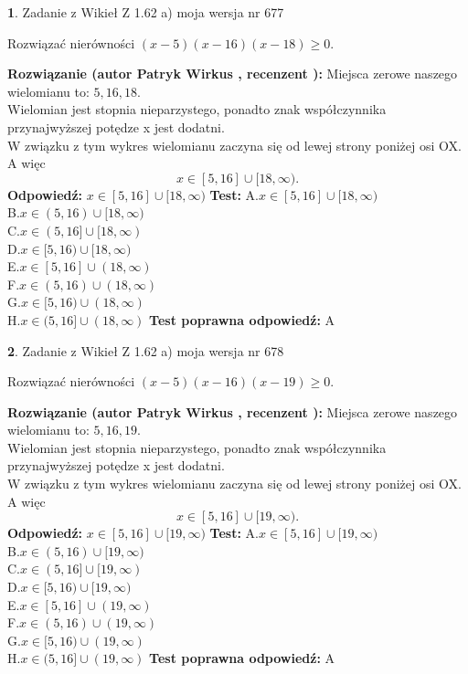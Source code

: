 \documentclass[12pt, a4paper]{article}
\theoremstyle{definition} %
\newtheorem{zad}{}
\newcommand{\zadStart}[1]{\begin{zad}#1\newline}
\newcommand{\zadStop}{\end{zad}}
\newcommand{\rozwStart}[2]{\noindent \textbf{Rozwiązanie (autor #1 , recenzent #2): }\newline}
\newcommand{\rozwStop}{\newline}
\newcommand{\odpStart}{\noindent \textbf{Odpowiedź:}\newline}
\newcommand{\odpStop}{\newline}
\newcommand{\testStart}{\noindent \textbf{Test:}\newline}
\newcommand{\testStop}{\newline}
\newcommand{\kluczStart}{\noindent \textbf{Test poprawna odpowiedź:}\newline}
\newcommand{\kluczStop}{\newline}
\begin{document}
\zadStart{Zadanie z Wikieł Z 1.62 a) moja wersja nr 677}

Rozwiązać nierówności $(x-5)(x-16)(x-18)\ge0$.
\zadStop
\rozwStart{Patryk Wirkus}{}
Miejsca zerowe naszego wielomianu to: $5, 16, 18$.\\
Wielomian jest stopnia nieparzystego, ponadto znak współczynnika przy\linebreak najwyższej potędze x jest dodatni.\\ W związku z tym wykres wielomianu zaczyna się od lewej strony poniżej osi OX. A więc $$x \in [5,16] \cup [18,\infty).$$
\rozwStop
\odpStart
$x \in [5,16] \cup [18,\infty)$
\odpStop
\testStart
A.$x \in [5,16] \cup [18,\infty)$\\
B.$x \in (5,16) \cup [18,\infty)$\\
C.$x \in (5,16] \cup [18,\infty)$\\
D.$x \in [5,16) \cup [18,\infty)$\\
E.$x \in [5,16] \cup (18,\infty)$\\
F.$x \in (5,16) \cup (18,\infty)$\\
G.$x \in [5,16) \cup (18,\infty)$\\
H.$x \in (5,16] \cup (18,\infty)$
\testStop
\kluczStart
A
\kluczStop



\zadStart{Zadanie z Wikieł Z 1.62 a) moja wersja nr 678}

Rozwiązać nierówności $(x-5)(x-16)(x-19)\ge0$.
\zadStop
\rozwStart{Patryk Wirkus}{}
Miejsca zerowe naszego wielomianu to: $5, 16, 19$.\\
Wielomian jest stopnia nieparzystego, ponadto znak współczynnika przy\linebreak najwyższej potędze x jest dodatni.\\ W związku z tym wykres wielomianu zaczyna się od lewej strony poniżej osi OX. A więc $$x \in [5,16] \cup [19,\infty).$$
\rozwStop
\odpStart
$x \in [5,16] \cup [19,\infty)$
\odpStop
\testStart
A.$x \in [5,16] \cup [19,\infty)$\\
B.$x \in (5,16) \cup [19,\infty)$\\
C.$x \in (5,16] \cup [19,\infty)$\\
D.$x \in [5,16) \cup [19,\infty)$\\
E.$x \in [5,16] \cup (19,\infty)$\\
F.$x \in (5,16) \cup (19,\infty)$\\
G.$x \in [5,16) \cup (19,\infty)$\\
H.$x \in (5,16] \cup (19,\infty)$
\testStop
\kluczStart
A
\kluczStop
\end{document}
